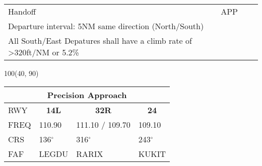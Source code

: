 \documentclass[10pt,landscape,a4paper]{article}
\begin{document}
\begin{textblock}{40}
\begin{table}[]
\begin{tabular}{lccccccc}
\multicolumn{2}{|l}{Handoff} & 
\multicolumn{4}{c}{\textunderscore{}APP} & 
\multicolumn{1}{c|}{} & 
\multicolumn{1}{l}{} \\ \cline{1-7}
\multicolumn{5}{l}{Departure interval: 5NM same direction (North/South)} \\
\multicolumn{5}{l}{All South/East Depatures shall have a climb rate of \textgreater{}320ft/NM or 5.2\%}
\end{tabular}
\end{table}
\end{textblock}



\begin{textblock}{100}(40, 90)
\begin{table}[]
\begin{tabular}{llll}
\multicolumn{4}{c}{\textbf{Precision Approach}} \\ \hline
\multicolumn{1}{|l|}{RWY} & \multicolumn{1}{c|}{\textbf{14L}} & \multicolumn{1}{c|}{\textbf{32R}} & \multicolumn{1}{c|}{\textbf{24}} \\ \hline
\multicolumn{1}{|l|}{FREQ} & \multicolumn{1}{l|}{110.90} & \multicolumn{1}{l|}{111.10 / 109.70} & \multicolumn{1}{l|}{109.10} \\
\multicolumn{1}{|l|}{CRS} & \multicolumn{1}{l|}{136$^\circ$} & \multicolumn{1}{l|}{316$^\circ$} & \multicolumn{1}{l|}{243$^\circ$} \\
\multicolumn{1}{|l|}{FAF} & \multicolumn{1}{l|}{LEGDU} & \multicolumn{1}{l|}{RARIX} & \multicolumn{1}{l|}{KUKIT} \\ \hline
\end{tabular}
\end{table}
\end{textblock}
\end{document}

